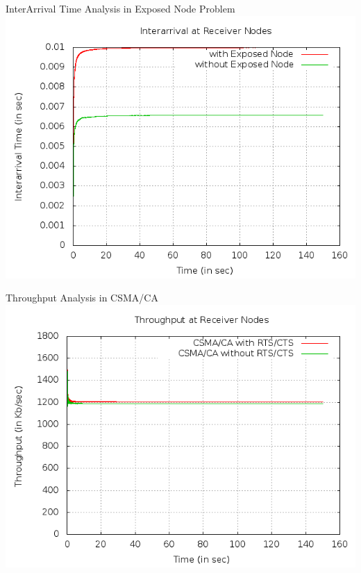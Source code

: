 \documentclass[a4paper,12pt]{report}
\begin{document}
\begin{center}
InterArrival Time Analysis in Exposed Node Problem
 \includegraphics[width=15 cm,height=13 cm]{./exposed_interarrival.png}


\end{center}
\begin{center}
Throughput Analysis in CSMA/CA
 \includegraphics[width=15 cm,height=15 cm]{./csma_throughput.png}


\end{center}
\end{document}

